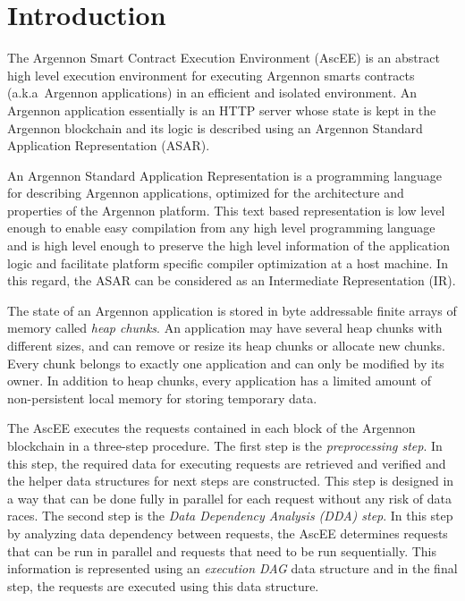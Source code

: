 

\section{Introduction}\label{sec:introduction}

The Argennon Smart Contract Execution Environment (AscEE) is an abstract high level execution environment for executing
Argennon smarts contracts (a.k.a\ Argennon applications) in an efficient and isolated environment. An Argennon
application essentially is an HTTP server whose state is
kept in the Argennon blockchain and its logic is described using an Argennon Standard Application Representation (ASAR).

An Argennon Standard Application Representation is a programming language for describing Argennon
applications, optimized
for the architecture and properties of the Argennon platform. This text based representation is low level
enough to enable easy compilation from any high level programming language and is high level enough to preserve
the high level information of the application logic and facilitate platform specific compiler optimization at a host
machine. In this regard, the ASAR can be considered as an Intermediate Representation (IR).

The state of an Argennon application is stored in byte addressable finite arrays of memory called
\emph{heap chunks}. An application may have several heap chunks with different sizes, and can remove or
resize its heap chunks or allocate new chunks. Every chunk belongs to exactly one application and can only be modified
by its owner. In addition to heap chunks, every application has a limited amount of non-persistent local memory for
storing temporary data.

The AscEE executes the requests contained in each block of the Argennon
blockchain in a three-step procedure. The first step is the \emph{preprocessing step}. In this step, the required
data for executing requests are retrieved and verified and the
helper data structures for next steps are constructed. This step is
designed in a way that can be done fully in parallel for each request without any risk of data races. The second
step is the \emph{Data Dependency Analysis (DDA) step}.
In this step by analyzing data dependency between requests, the AscEE determines requests that can be run in parallel
and requests that need to be run sequentially. This information is represented using an \emph{execution DAG} data
structure and in the final step, the requests are executed using this data structure.


